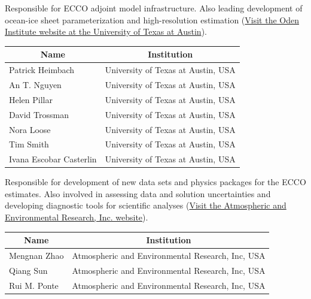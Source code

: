 \vspace{.25cm}
Responsible for ECCO adjoint model infrastructure. Also leading development of ocean-ice sheet parameterization and high-resolution estimation (\hyperlink{https://www.oden.utexas.edu/}{Visit the Oden Institute website at the University of Texas at Austin}).

\vspace{.25cm}
\begin{center}
\begin{tabular}{m{} m{} }
    \multicolumn{1}{c}{\textbf{Name}} & \multicolumn{1}{c}{\textbf{Institution}} \\ \hline
    Patrick Heimbach & University of Texas at Austin, USA \\ \hline
    An T. Nguyen & University of Texas at Austin, USA \\ \hline
    Helen Pillar & University of Texas at Austin, USA \\ \hline
    David Trossman & University of Texas at Austin, USA \\ \hline
    Nora Loose & University of Texas at Austin, USA \\ \hline
    Tim Smith & University of Texas at Austin, USA \\ \hline
    Ivana Escobar Casterlin & University of Texas at Austin, USA \\ \hline
\end{tabular}
\end{center}

\vspace{.25cm}
Responsible for development of new data sets and physics packages for the ECCO estimates. Also involved in assessing data and solution uncertainties and developing diagnostic tools for scientific analyses (\hyperlink{https://www.aer.com/}{Visit the Atmospheric and Environmental Research, Inc. website}).

\vspace{.25cm}
\begin{center}
\begin{tabular}{m{} m{} }
    \multicolumn{1}{c}{\textbf{Name}} & \multicolumn{1}{c}{\textbf{Institution}} \\ \hline
    Mengnan Zhao & Atmospheric and Environmental Research, Inc, USA \\ \hline
    Qiang Sun & Atmospheric and Environmental Research, Inc, USA \\ \hline
    Rui M. Ponte & Atmospheric and Environmental Research, Inc, USA \\ \hline
\end{tabular}
\end{center}

